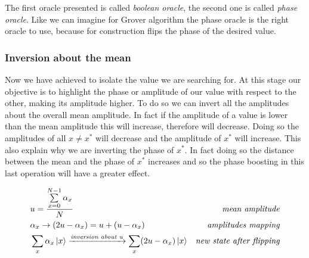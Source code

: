 \documentclass[main.tex]{subfiles}
\begin{document}
The first oracle presented is called \textit{boolean oracle}, the second one is called \textit{phase oracle}. Like we can imagine for Grover algorithm the phase oracle is the right oracle to use, because for construction flips the phase of the desired value.

\subsubsection{Inversion about the mean}
Now we have achieved to isolate the value we are searching for. At this stage our objective is to highlight the phase or amplitude of our value with respect to the other, making its amplitude
higher. To do so we can invert all the amplitudes about the overall mean amplitude. In fact if the amplitude of a value is lower than the mean amplitude this will increase, therefore will decrease. Doing so the amplitudes of all $x\neq x^*$ will decrease and the amplitude of $x^*$ will increase. This also explain why we are inverting the phase of $x^*$. In fact doing so the distance between the mean and the phase of $x^*$ increases and so the phase boosting in this last operation will have a greater effect.

\begin{align*}
& u=\frac{\sum\limits_{x=0}^{N-1}\alpha_x}{N}  &\textit{mean amplitude}\\
& \alpha_x \rightarrow (2u-\alpha_x)=u+(u-\alpha_x) &\textit{amplitudes mapping}\\
& \sum_{x}\alpha_{x}\ket{x} \xrightarrow{\textit{inversion about u}} \sum_{x}(2u-\alpha_x)\ket{x} &\textit{new state after flipping}
\end{align*}
\end{document}
